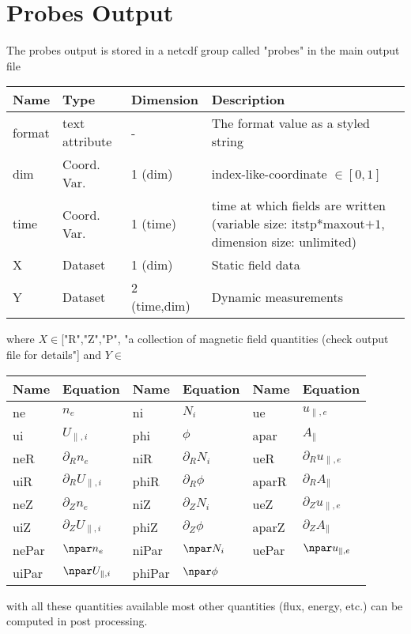 \section{Probes Output}\label{sec:probes-output}
The probes output is stored in a netcdf group called "probes" in the main output file
%
\begin{longtable}{lll>{\RaggedRight}p{7cm}}
\toprule
\rowcolor{gray!50}\textbf{Name} &  \textbf{Type} & \textbf{Dimension} & \textbf{Description}  \\ \midrule
format           & text attribute   & - & The format value as a styled string \\
dim              & Coord. Var. & 1 (dim) & index-like-coordinate $\in [0,1]$ \\
time             & Coord. Var. & 1 (time)& time at which fields are written (variable size: itstp*maxout$+1$, dimension size: unlimited) \\
X                & Dataset & 1 (dim)      & Static field data \\
Y                & Dataset & 2 (time,dim) & Dynamic measurements \\
\bottomrule
\end{longtable}
where $X\in $["R","Z","P", "a collection of magnetic field quantities (check output file for details"]
and $Y\in $
\begin{longtable}{llllll}
\toprule
\rowcolor{gray!50}\textbf{Name} &  \textbf{Equation} & \textbf{Name} &  \textbf{Equation} & \textbf{Name} & \textbf{Equation}\\
\midrule
    ne &$n_e$ &
    ni &$N_i$ &
    ue &$u_{\parallel,e}$ \\
    ui &$U_{\parallel,i}$ &
    phi &$\phi$ &
    apar &$A_\parallel$ \\
    neR &$\partial_R n_e$ &
    niR &$\partial_R N_i$ &
    ueR &$\partial_R u_{\parallel,e}$ \\
    uiR &$\partial_R U_{\parallel,i}$ &
    phiR &$\partial_R \phi$ &
    aparR &$\partial_R A_\parallel$ \\
    neZ &$\partial_Z n_e$ &
    niZ &$\partial_Z N_i$ &
    ueZ &$\partial_Z u_{\parallel,e}$ \\
    uiZ &$\partial_Z U_{\parallel,i}$ &
    phiZ &$\partial_Z \phi$ &
    aparZ &$\partial_Z A_\parallel$ \\
    nePar &$\npar n_e$ &
    niPar &$\npar N_i$ &
    uePar &$\npar u_{\parallel,e}$ \\
    uiPar &$\npar U_{\parallel,i}$ &
    phiPar &$\npar \phi$ &
     & \\
\bottomrule
\end{longtable}
with all these quantities available most other quantities (flux, energy, etc.)
can be computed in post processing.

